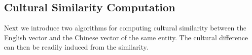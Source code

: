 %
%
%
%
%

\subsection{Cultural Similarity Computation}
\label{sec:sim}
Next we introduce two algorithms for computing cultural similarity between
the English vector and the Chinese vector of the same entity. The
cultural difference can then be readily induced from the similarity.

